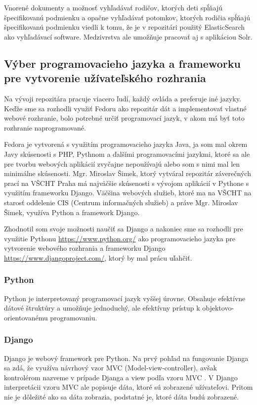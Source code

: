 \documentclass[thesis=M,slovak]{FITthesis}[2013/05/06]
\begin{document}
Vnorené dokumenty a možnosť vyhľadávať rodičov, ktorých deti spĺňajú špecifikovanú podmienku a opačne vyhľadávať potomkov, ktorých rodičia spĺňajú špecifikovanú podmienku viedli k tomu, že je v repozitári použitý ElasticSearch ako vyhľadávací software. Medzivrstva ale umožňuje pracovať aj s aplikáciou Solr.

\subsection{Výber programovacieho jazyka a frameworku pre vytvorenie užívateľského rozhrania}
Na vývoji repozitára pracuje viacero ľudí, každý ovláda a preferuje iné jazyky. Keďže sme sa rozhodli využiť Fedoru ako repozitár dát a implementovať vlastné webové rozhranie, bolo potrebné určiť programovací jazyk, v akom má byť toto rozhranie naprogramované.

Fedora je vytvorená s využitím programovacieho jazyka Java, ja som mal okrem Javy skúsenosti s PHP, Pythnom a ďalšími programovacími jazykmi, ktoré sa ale pre tvorbu webových aplikácií zvyčajne nepoužívajú alebo som s nimi mal len minimálne skúsenosti. Mgr. Miroslav Šimek, ktorý vytváral repozitár záverečných prací na VŠCHT Praha má najväčšie skúsenosti s vývojom aplikácií v Pythone s využitím frameworku Django. Väčšina webových služieb, ktoré ma na VŠCHT na starosť oddelenie CIS (Centrum informačných služieb) a práve Mgr. Miroslav Šimek, využíva Python a framework Django.

Zhodnotil som svoje možnosti naučiť sa Django a nakoniec sme sa rozhodli pre využitie Pythonu \url{https://www.python.org/} ako programovacieho jazyka pre vytvorenie webového rozhrania a frameworku Django \url{https://www.djangoproject.com/}, ktorý by mal prácu uľahčiť.

\subsubsection{Python}
Python je interpretovaný programovací jazyk vyššej úrovne. Obsahuje efektívne dátové štruktúry a umožňuje jednoduchý, ale efektívny prístup k objektovo-orientovanému programovaniu. \cite{Python}

\subsubsection{Django}
Django je webový framework pre Python. Na prvý pohľad na fungovanie Djanga sa zdá, že využíva návrhový vzor MVC (Model-view-controller), avšak kontrolérom nazveme v prípade Djanga  a view podľa vzoru MVC . V Django interpretácii vzoru MVC ale  popisuje dáta, ktoré sú zobrazené užívateľovi. Pritom nie je dôležité ako sa dáta zobrazia, podstatné je, ktoré dáta budú zobrazené.
\end{document}
